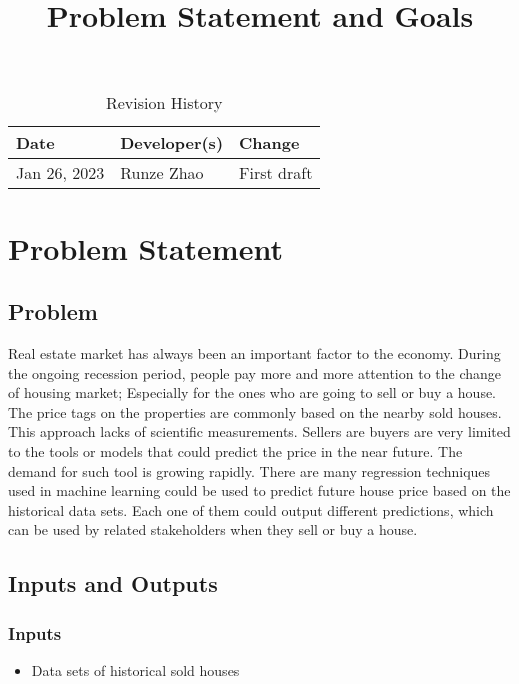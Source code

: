 \documentclass{article}
\title{Problem Statement and Goals\\\progname}
\author{\authname}
\date{}
\begin{document}
\maketitle

\begin{table}[hp]
\caption{Revision History} \label{TblRevisionHistory}
\begin{tabularx}{\textwidth}{llX}
\toprule
\textbf{Date} & \textbf{Developer(s)} & \textbf{Change}\\
\midrule
Jan 26, 2023 & Runze Zhao & First draft\\
\bottomrule
\end{tabularx}
\end{table}

\section{Problem Statement}

\subsection{Problem}
Real estate market has always been an important factor to the economy. During the ongoing recession period, people pay more and more attention to the change of housing market; Especially for the ones who are going to sell or buy a house. The price tags on the properties are commonly based on the nearby sold houses. This approach lacks of scientific measurements. Sellers are buyers are very limited to the tools or models that could predict the price in the near future. The demand for such tool is growing rapidly. There are many regression techniques used in machine learning could be used to predict future house price based on the historical data sets. Each one of them could output different predictions, which can be used by related stakeholders when they sell or buy a house.

\subsection{Inputs and Outputs}
\subsubsection{Inputs}
\begin{itemize}
    \item Data sets of historical sold houses
\end{itemize}
\end{document}
